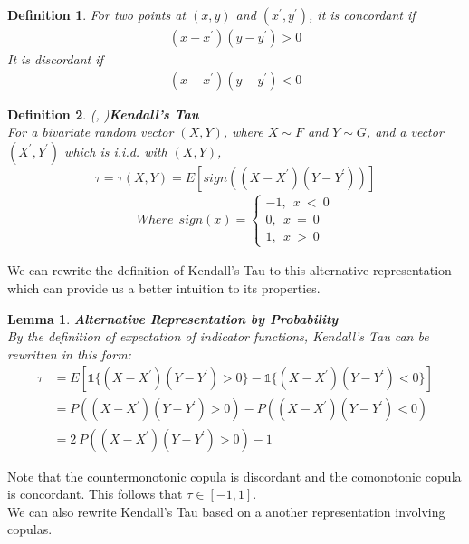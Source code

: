 \documentclass[12pt]{report}
\newtheorem{lemma}{Lemma}[subsection]
\newtheorem{definition}{Definition}[subsection]
\newcommand{\1}{\mathbf{1}}
\begin{document}
\begin{flushleft}
\begin{definition}
For two points at $(x,y)$ and $(x^{'},y^{'})$, it is concordant if 
\begin{align*}
(x - x^{'})(y - y^{'}) > 0
\end{align*}
It is discordant if 
\begin{align*}
(x - x^{'})(y - y^{'}) < 0
\end{align*}
\end{definition}

\begin{definition}\label{KendallTauDefinition}
\textit{\normalfont(\cite{KendallTauAuthor1938}, \cite{HofertBook})}\:\textbf{Kendall's Tau} \\
For a bivariate random vector $(X,Y)$, where $X \sim F$ and $Y \sim G$, and a vector $(X^{'},Y^{'})$ which is i.i.d. with $(X,Y)$,
\begin{equation*}
\tau = \tau(X,Y) = E[sign ( (X - X^{'})(Y - Y^{'}) )]
\end{equation*}
\begin{align*}
Where \: \: sign(x) = 
\left\{ 
\begin{array}{rll}
-1, \: \:  x \: < \: 0 \\
0, \: \: x \: = \: 0 \\
1, \: \: x \: > \: 0
\end{array}
\right.
\end{align*}
\end{definition}

We can rewrite the definition of Kendall's Tau to this alternative representation which can provide us a better intuition to its properties.

\begin{lemma}
\label{KendallTauGeneralizationProb}
\textit{\normalfont\parencite{HofertBook}}\:\textbf{Alternative Representation by Probability}\\
By the definition of expectation of indicator functions, Kendall's Tau can be rewritten in this form:
\begin{align*}
\tau &= E[\mathds{1}\{(X - X^{'})(Y - Y^{'})  >  0 \} - \mathds{1} \{ (X - X^{'})(Y - Y^{'})  <  0 \}] \\
&= P \left( (X - X^{'})(Y - Y^{'}) > 0  \right) - P \left( (X - X^{'})(Y - Y^{'}) < 0  \right)\\
&= 2 \: P \left( (X - X^{'})(Y - Y^{'}) > 0  \right) - 1
\end{align*}
\end{lemma}

Note that the countermonotonic copula is discordant and the comonotonic copula is concordant. This follows that $\tau \in [-1,1]$.\\
\vspace{0.5cm}
We can also rewrite Kendall's Tau based on a another representation involving copulas.\\


\end{flushleft}
\end{document}
